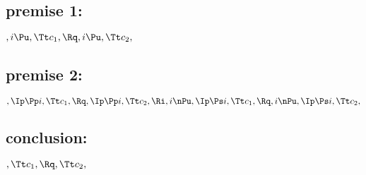 \subsection{premise 1:}
\begin{math}
, i \Pu, \Tt c_1, \Rq , i \Pu, \Tt c_2,
\end{math}
\bigskip
\bigskip
\subsection{premise 2:}
\begin{math}
, \Ip \Pp i, \Tt c_1 , \Rq , \Ip \Pp i, \Tt c_2 , \Ri \\\\
,i \nPu, \Ip \Ps i, \Tt c_1, \Rq , i \nPu, \Ip \Ps i, \Tt c_2,
\end{math}
\bigskip
\bigskip
\subsection{conclusion:}
\begin{math}
, \Tt c_1, \Rq , \Tt c_2,
\end{math}



\newpage